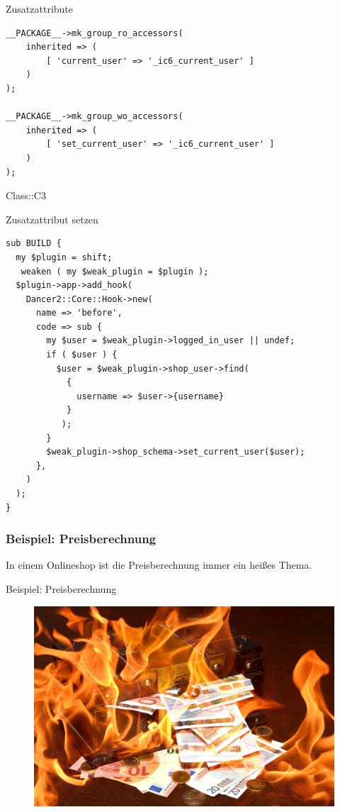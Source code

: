 \begin{frame}[fragile]{Zusatzattribute}
\begin{lstlisting}
__PACKAGE__->mk_group_ro_accessors(
    inherited => (
        [ 'current_user' => '_ic6_current_user' ]
    )
);

__PACKAGE__->mk_group_wo_accessors(
    inherited => (
        [ 'set_current_user' => '_ic6_current_user' ]
    )
);
\end{lstlisting}

Class::C3
\end{frame}

\begin{frame}[fragile]{Zusatzattribut setzen}
\begin{lstlisting}
sub BUILD {
  my $plugin = shift;
   weaken ( my $weak_plugin = $plugin );
  $plugin->app->add_hook(
    Dancer2::Core::Hook->new(
      name => 'before',
      code => sub {
        my $user = $weak_plugin->logged_in_user || undef;
        if ( $user ) {
          $user = $weak_plugin->shop_user->find(
            {
              username => $user->{username}
            }
           );
        }
        $weak_plugin->shop_schema->set_current_user($user);
      },
    )
  );
}
\end{lstlisting}
\end{frame}


\subsubsection{Beispiel: Preisberechnung}

In einem Onlineshop ist die Preisberechnung immer ein heißes Thema.

\begin{frame}{Beispiel: Preisberechnung}
\begin{figure}[!ht]
\centering
\includegraphics[width=1\linewidth]{img/treasure-chest-fire.jpg}
\end{figure}
\end{frame}

